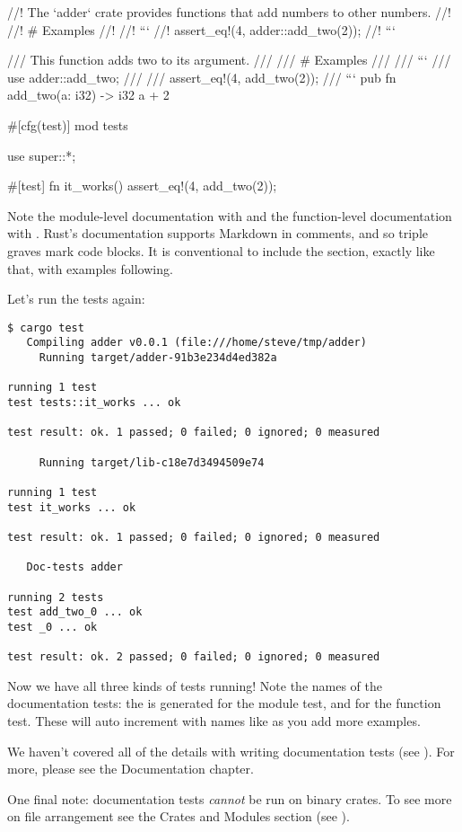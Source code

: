 \begin{rustc}
//! The `adder` crate provides functions that add numbers to other numbers.
//!
//! # Examples
//!
//! ```
//! assert_eq!(4, adder::add_two(2));
//! ```

/// This function adds two to its argument.
///
/// # Examples
///
/// ```
/// use adder::add_two;
///
/// assert_eq!(4, add_two(2));
/// ```
pub fn add_two(a: i32) -> i32 {
    a + 2
}

#[cfg(test)]
mod tests {
    use super::*;

    #[test]
    fn it_works() {
        assert_eq!(4, add_two(2));
    }
}
\end{rustc}

Note the module-level documentation with \code{//!} and the function-level documentation with \code{///}. Rust's documentation 
supports Markdown in comments, and so triple graves mark code blocks. It is conventional to include the  section, 
exactly like that, with examples following.

\blank

Let's run the tests again:

\begin{verbatim}
$ cargo test
   Compiling adder v0.0.1 (file:///home/steve/tmp/adder)
     Running target/adder-91b3e234d4ed382a

running 1 test
test tests::it_works ... ok

test result: ok. 1 passed; 0 failed; 0 ignored; 0 measured

     Running target/lib-c18e7d3494509e74

running 1 test
test it_works ... ok

test result: ok. 1 passed; 0 failed; 0 ignored; 0 measured

   Doc-tests adder

running 2 tests
test add_two_0 ... ok
test _0 ... ok

test result: ok. 2 passed; 0 failed; 0 ignored; 0 measured
\end{verbatim}

Now we have all three kinds of tests running! Note the names of the documentation tests: the  is generated for the module 
test, and  for the function test. These will auto increment with names like  as you add more examples.

\blank

We haven’t covered all of the details with writing documentation tests (see ). For more, please see 
the Documentation chapter.

\blank

One final note: documentation tests \emph{cannot} be run on binary crates. To see more on file arrangement see the Crates and Modules section
(see ).
